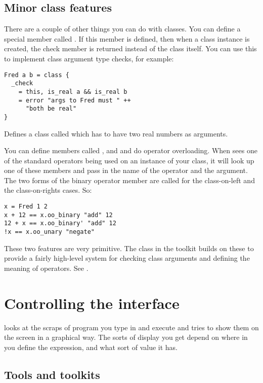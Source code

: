 \subsection{Minor class features}

There are a couple of other things you can do with classes. You can define a
special member called . If this member is defined, then when a
class instance is created, the check member is returned instead of the class
itself. You can use this to implement class argument type checks, for example:

\begin{verbatim}
Fred a b = class { 
  _check
    = this, is_real a && is_real b
    = error "args to Fred must " ++
      "both be real"
}
\end{verbatim}

\noindent
Defines a class called  which has to have two real numbers as
arguments.

You can define members called ,  and
 and do operator overloading. When \nip{} sees one of the
standard operators being used on an instance of your class, it will look up
one of these members and pass in the name of the operator and the argument.
The two forms of the binary operator member are called for the class-on-left
and the class-on-rights cases. So:

\begin{verbatim}
x = Fred 1 2
x + 12 == x.oo_binary "add" 12
12 + x == x.oo_binary' "add" 12
!x == x.oo_unary "negate" 
\end{verbatim}

These two features are very primitive. The  class in the
 toolkit builds on these to provide a fairly high-level system for
checking class arguments and defining the meaning of operators.
See .

\section{Controlling the interface}

\nip{} looks at the scraps of program you type in and execute and tries to
show them on the screen in a graphical way. The sorts of display you get
depend on where in \nip{} you define the expression, and what sort of value it
has.

\subsection{Tools and toolkits}

